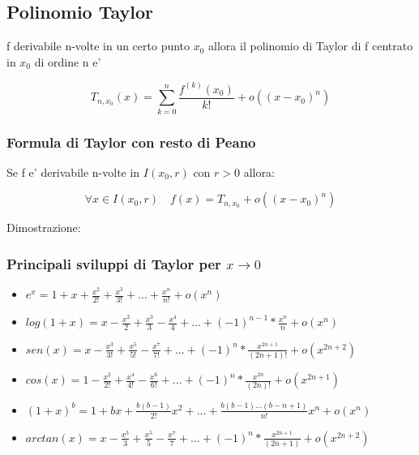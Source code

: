\documentclass{article}
\begin{document}
        \subsection{Polinomio Taylor}
        \begin{flushleft}
          f derivabile n-volte in un certo punto $x_0$ allora il polinomio di Taylor di f centrato in $x_0$ di ordine n e'
        \end{flushleft}
        \begin{equation}
          T_{n,x_0}(x)= \sum_{k=0}^n \frac{f^{(k)}(x_0)}{k!}+o((x-x_0)^n)
        \end{equation}
        \subsubsection{Formula di Taylor con resto di Peano}
        \begin{flushleft}
          Se f e' derivabile n-volte in $I(x_0,r)$ con $r>0$ allora:
        \end{flushleft}
        \begin{equation}
          \forall x \in I(x_0,r) \quad f(x)=T_{n,x_0}+o((x-x_0)^n)
        \end{equation}
        \begin{flushleft}
          Dimostrazione:
        \end{flushleft}
        \subsubsection{Principali sviluppi di Taylor per $x \to 0$}
        \begin{itemize}
          \item $e^x=1+x+\frac{x^2}{2!}+\frac{x^3}{3!}+...+\frac{x^n}{n!}+o(x^n)$
          \item $log(1+x)=x-\frac{x^2}{2}+\frac{x^3}{3}-\frac{x^4}{4}+...+(-1)^{n-1}*\frac{x^n}{n}+o(x^n)$
          \item $sen(x)=x-\frac{x^3}{3!}+\frac{x^5}{5!}-\frac{x^7}{7!}+...+(-1)^n*\frac{x^{2n+1}}{(2n+1)!}+o(x^{2n+2})$
          \item $cos(x)=1-\frac{x^2}{2!}+\frac{x^4}{4!}-\frac{x^6}{6!}+...+(-1)^n*\frac{x^{2n}}{(2n)!}+o(x^{2n+1})$
          \item $(1+x)^b=1+bx+\frac{b(b-1)}{2!}x^2+...+\frac{b(b-1)...(b-n+1)}{n!}x^n+o(x^n)$
          \item $arctan(x)=x-\frac{x^3}{3}+\frac{x^5}{5}-\frac{x^7}{7}+...+(-1)^n*\frac{x^{2n+1}}{(2n+1)}+o(x^{2n+2})$
        \end{itemize}
\end{document}
